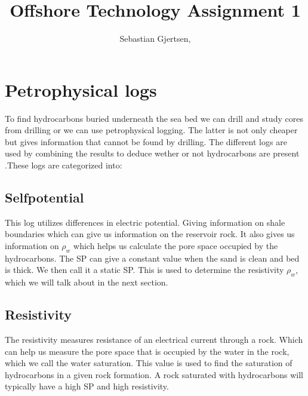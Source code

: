 \documentclass[DIV=calc, paper=a4, fontsize=11pt, twocolumn]{scrartcl}	 %
\title{Offshore Technology  Assignment 1} %
\author{Sebastian Gjertsen, } %
\date{} %
\newcommand{\initial}[1]{ %
\lettrine[lines=3,lhang=0.3,nindent=0em]{
\color{DarkGoldenrod}
{\textsf{#1}}}{}}
\begin{document}
\maketitle %

\thispagestyle{fancy} %










\section*{Petrophysical logs}
To find hydrocarbons buried underneath the sea bed we can drill and study cores from drilling or we can use petrophysical logging. The latter is not only cheaper but gives information that cannot be found by drilling. The different logs are used by combining the results to deduce wether or not hydrocarbons are present .These logs are categorized into:
\subsection*{Selfpotential}
This log utilizes differences in electric potential. Giving information on shale boundaries which can give us information on the reservoir rock. It also gives us information on $\rho_w$ which helps us calculate the pore space occupied by the hydrocarbons. The SP can give a constant value when the sand is clean and bed is thick. We then call it a static SP. This is used to determine the resistivity  $\rho_w$, which we will talk about in the next section.
\subsection*{Resistivity}
The resistivity measures resistance of an electrical current through a rock. Which can help us measure the pore space that is occupied by the water in the rock, which we call the water saturation. This value is used to find the saturation of hydrocarbons in a given rock formation. A rock saturated with hydrocarbons will typically have a high SP and high resistivity.
\end{document}
